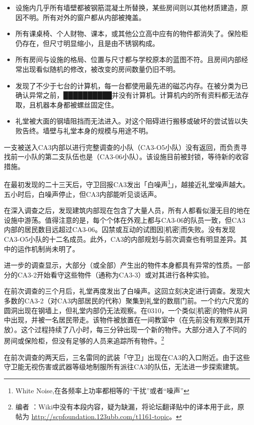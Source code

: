 \begin{itemize}
	\item 设施内几乎所有墙壁都被钢筋混凝土所替换，某些房间则以其他材质建造，原因不明。所有对外的窗户都从内部被掩盖。
	\item 所有课桌椅、个人财物、课本，或其他公立高中应有的物件都消失了。保险柜仍存在，但尺寸明显缩小，且是由不锈钢构成。
	\item 所有房间与设施的格局、位置与尺寸都与学校原本的蓝图不符。且房间内部经常出现看似随机的修改，被改变的房间数量仍旧不明。
	\item 发现了不少于七台的计算机，每一台都使用最先进的磁芯内存。在被分类为已确认异常之前，██████████并没有计算机。计算机内的所有资料都无法存取，且机器本身都被螺丝固定住。
	\item 礼堂被大面的钢墙阻挡而无法进入。对这个阻碍进行搬移或破坏的尝试皆以失败告终。墙壁与礼堂本身的规模与用途不明。
\end{itemize}

一支被送入CA3内部以进行完整调查的小队（CA3-O5小队）没有返回，而负责寻找前一小队的第二支队伍也是（CA3-06小队）。该设施目前被封锁，等待新的收容措施。

在最初发现的二十三天后，守卫回报CA3发出「白噪声\footnote{White Noise,在各频率上功率都相等的“干扰”或者“噪声”}」，越接近礼堂噪声越大。五小时后，白噪声停止，但CA3内部能听见谈话声。

在深入调查之后，发现建筑内部现在包含了大量人员，所有人都看似漫无目的地在设施中游荡。值得注意的是，每个个体在外观上都与CA3-06的队员一致，但CA3内部的居民数目远超过CA3-06。囚禁或互动的试图因[机密]而失败。没有发现CA3-O5小队的十二名成员。此外，CA3的内部规划与前次调查也有明显差异。其中的运作机制尚未明了。

进一步的调查显示，大部分（或全部）产生出的物件本身都具有异常的性质。一部分的CA3-2开始看守这些物件（通称为CA3-3）或对其进行各种实验。

在前次调查的三个月后，礼堂再度发出了白噪声。这回立刻决定进行调查。发现大多数的CA3-2（对CA3内部居民的代称）聚集到礼堂的数扇门前。一个约六尺宽的圆洞出现在钢墙上，但礼堂内部仍无法观察。在0310，一个类似[机密]的物件从洞中出现，并被一名居民带走。该物件被放置在一间教室中（在先前没有观察到其开放）。这个过程持续了八小时，每三分钟出现一个新的物件。大部分进入了不同的房间或保险柜，但没有足够的人员来追踪所有物件。\footnote{
	编者 \QIS ：Wiki中没有本段内容，疑为缺漏，将论坛翻译贴中的译本用于此，原帖为 \url{http://scpfoundation.123ubb.com/t1161-topic}。
}

在前次调查的两天后，三名雷同的武装「守卫」出现在CA3的入口附近。由于这些守卫能无视伤害或武器等级地制服所有派往CA3的队伍，无法进一步探索建筑。

